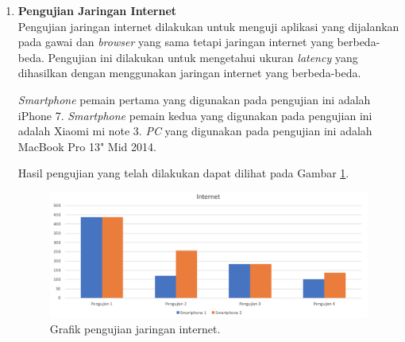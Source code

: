 \begin{enumerate}
%		
%		
%		
%
	
	
	\item \textbf{Pengujian Jaringan Internet} \\
	Pengujian jaringan internet dilakukan untuk menguji aplikasi yang dijalankan pada gawai dan \textit{browser} yang sama tetapi jaringan internet yang berbeda-beda. Pengujian ini dilakukan untuk mengetahui ukuran \textit{latency} yang dihasilkan dengan menggunakan jaringan internet yang berbeda-beda. 
	
	\textit{Smartphone} pemain pertama yang digunakan pada pengujian ini adalah iPhone 7. \textit{Smartphone} pemain kedua yang digunakan pada pengujian ini adalah Xiaomi mi note 3. \textit{PC} yang digunakan pada pengujian ini adalah MacBook Pro 13" Mid 2014.
	
	Hasil pengujian yang telah dilakukan dapat dilihat pada Gambar \ref{fig:pengujian_internet}.
	
	\begin{figure}[H]
		\centering
		\includegraphics[scale=0.4]{Gambar/grafik_internet_bar}
		\caption{Grafik pengujian jaringan internet.}
		\label{fig:pengujian_internet}
	\end{figure}


\end{enumerate}
